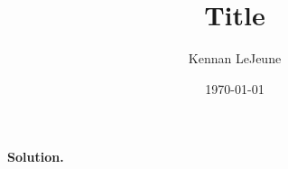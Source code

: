 \documentclass[12pt]{article}
\newenvironment{problem}[2][Problem]{\begin{trivlist}
\item[\hskip \labelsep {\bfseries #1}\hskip \labelsep {\bfseries #2.}]}{\end{trivlist}}
\theoremstyle{plain}
\theoremstyle{definition}
\theoremstyle{remark}
\begin{document}
\title{Title}
\author{Kennan LeJeune}
\date{\today}
\maketitle
    \begin{problem}{P1.10}

    \end{problem}
    \paragraph{Solution.}
        \Blindtext
\end{document}
